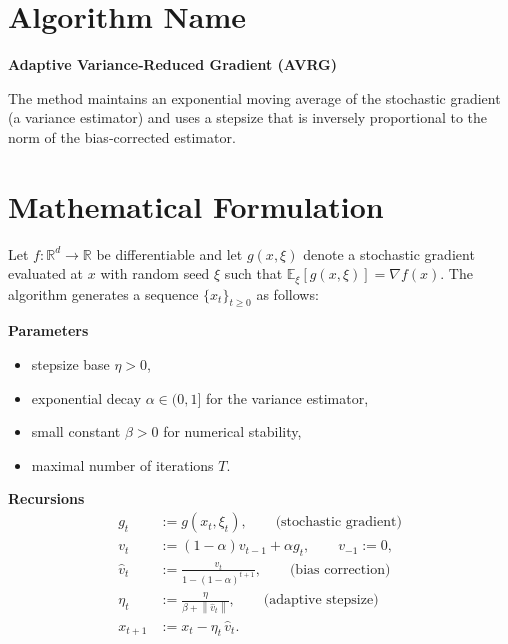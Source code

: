 \documentclass{article}
\newcommand{\E}{\mathbb{E}}
\newcommand{\norm}[1]{\left\lVert#1\right\rVert}
\begin{document}
\section*{Algorithm Name}
\textbf{Adaptive Variance‑Reduced Gradient (AVRG)}  

The method maintains an exponential moving average of the stochastic gradient (a variance estimator) and uses a stepsize that is inversely proportional to the norm of the bias‑corrected estimator.

\section*{Mathematical Formulation}
Let $f:\mathbb{R}^d\rightarrow\mathbb{R}$ be differentiable and let $g(x,\xi)$ denote a stochastic gradient evaluated at $x$ with random seed $\xi$ such that $\E_{\xi}[g(x,\xi)]=\nabla f(x)$.  
The algorithm generates a sequence $\{x_t\}_{t\ge 0}$ as follows:

\bigskip
\noindent\textbf{Parameters}
\begin{itemize}[noitemsep]
    \item stepsize base $\eta>0$,
    \item exponential decay $\alpha\in(0,1]$ for the variance estimator,
    \item small constant $\beta>0$ for numerical stability,
    \item maximal number of iterations $T$.
\end{itemize}
\bigskip

\noindent\textbf{Recursions}
\begin{align}
    g_t &:= g(x_t,\xi_t), \qquad\text{(stochastic gradient)} \label{eq:gt}\\
    v_t &:= (1-\alpha)v_{t-1}+\alpha g_t, \qquad v_{-1}:=0, \label{eq:vt}\\
    \hat v_t &:= \frac{v_t}{1-(1-\alpha)^{t+1}}, \qquad\text{(bias correction)} \label{eq:hatvt}\\
    \eta_t &:= \frac{\eta}{\beta+\norm{\hat v_t}}, \qquad\text{(adaptive stepsize)} \label{eq:etat}\\
    x_{t+1} &:= x_t-\eta_t\,\hat v_t . \label{eq:xt}
\end{align}
\end{document}
